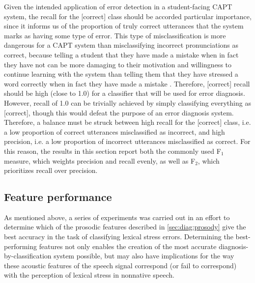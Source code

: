 	Given the intended application of error detection in a student-facing CAPT system, the recall for the [correct] class should be accorded particular importance, since it informs us of the proportion of truly correct utterances that the system marks as having some type of error. This type of misclassification is more dangerous for a CAPT system than misclassifying incorrect pronunciations as correct, because telling a student that they have made a mistake when in fact they have not can be more damaging to their motivation and willingness to continue learning with the system than telling them that they have stressed a word correctly when in fact they have made a mistake \citep{Neri2002}. Therefore, [correct] recall should be high (close to 1.0) for a classifier that will be used for error diagnosis. However, recall of 1.0 can be trivially achieved by simply classifying everything as [correct], though this would defeat the purpose of an error diagnosis system. Therefore, a balance must be struck between high recall  for the [correct] class, i.e. a low proportion of correct utterances misclassified as incorrect, and high precision, i.e. a low proportion of incorrect utterances misclassified as correct. 
	For this reason, the results in this section report both the commonly used F$_1$ measure, which weights precision and recall evenly, as well as F$_2$, which prioritizes recall over precision.
	
	 
	

		
	\subsection{Feature performance}
	\label{sec:classification:features}
	
		As mentioned above, a series of experiments was carried out in an effort to determine which of the prosodic features described in \cref{sec:diag:prosody} give the best accuracy in the task of classifying lexical stress errors. Determining the best-performing features not only enables the creation of the most accurate diagnosis-by-classification system possible, but may also have implications for the way these acoustic features of the speech signal correspond (or fail to correspond) with the perception of lexical stress in nonnative speech. 
		
